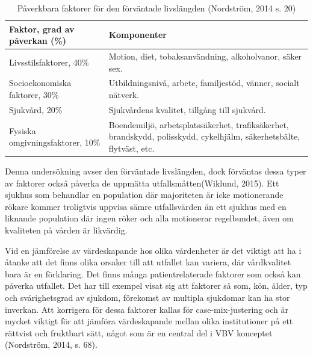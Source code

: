 \begin{table}[h]
\centering
\caption{Påverkbara faktorer för den förväntade livslängden (Nordström, 2014 s. 20)}
\label{tab:livslangd}
\begin{tabular}{|p{6cm}|p{6cm}|}
\hline
Faktor, grad av påverkan (\%)    & Komponenter                                                                                                                        \\ \hline
Livsstilsfaktorer, 40\%          & Motion, diet, tobaksanvändning, alkoholvanor, säker sex.                                                                           \\ \hline
Socioekonomiska faktorer, 30\%   & Utbildningsnivå, arbete, familjestöd, vänner, socialt nätverk.                                                                     \\ \hline
Sjukvård, 20\%                   & Sjukvårdens kvalitet, tillgång till sjukvård. \\ \hline

Fysiska omgivningsfaktorer, 10\% & Boendemiljö, arbetsplatssäkerhet, trafiksäkerhet, brandskydd, polisskydd, cykelhjälm, säkerhetsbälte, flytväst, etc.               \\ \hline
\end{tabular}
\end{table}

Denna undersökning avser den förväntade livslängden, dock förväntas dessa typer av faktorer också påverka de uppmätta utfallsmåtten(Wiklund, 2015). Ett sjukhus som behandlar en population där majoriteten är icke motionerande rökare kommer troligtvis uppvisa sämre utfallsvärden än ett sjukhus med en liknande population där ingen röker och alla motionerar regelbundet, även om kvaliteten på vården är likvärdig.

Vid en jämförelse av värdeskapande hos olika vårdenheter är det viktigt att ha i åtanke att det finns olika orsaker till att utfallet kan variera, där vårdkvalitet bara är en förklaring. Det finns många patientrelaterade faktorer som också kan påverka utfallet. Det har till exempel visat sig att faktorer så som, kön, ålder, typ och svårighetsgrad av sjukdom, förekomst av multipla sjukdomar kan ha stor inverkan. Att korrigera för dessa faktorer kallas för case-mix-justering och är mycket viktigt för att jämföra värdeskapande mellan olika institutioner på ett rättvist och fruktbart sätt, något som är en central del i VBV konceptet (Nordström, 2014, s. 68).

